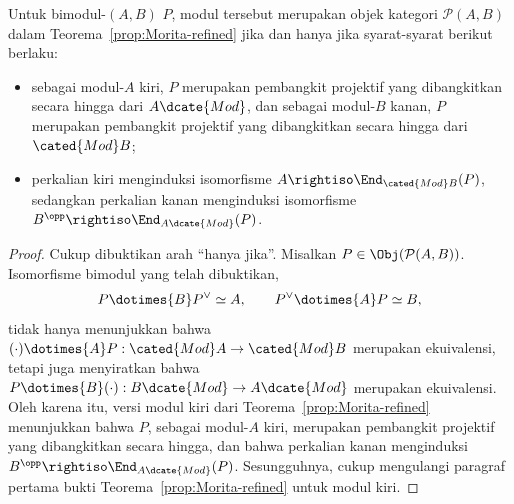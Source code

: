 \begin{corollary}\label{prop:Morita-refined-symm}
	Untuk bimodul-$(A,B)$ $P$, modul tersebut merupakan objek kategori
	$\mathcal{P}(A,B)$ dalam Teorema~\ref{prop:Morita-refined} jika dan hanya
	jika syarat-syarat berikut berlaku:
	\begin{itemize}
		\item sebagai modul-$A$ kiri, $P$ merupakan pembangkit projektif yang
		dibangkitkan secara hingga dari $A\dcate{Mod}$, dan sebagai modul-$B$
		kanan, $P$ merupakan pembangkit projektif yang dibangkitkan secara
		hingga dari $\cated{Mod}B$;
		\item perkalian kiri menginduksi isomorfisme
		$A\rightiso\End_{\cated{Mod}B}(P)$, sedangkan perkalian kanan
		menginduksi isomorfisme
		$B^{\opp}\rightiso\End_{A\dcate{Mod}}(P)$.
	\end{itemize}
\end{corollary}
\begin{proof}
	Cukup dibuktikan arah ``hanya jika''. Misalkan
	$P\in\Obj(\mathcal{P}(A,B))$. Isomorfisme bimodul yang telah
	dibuktikan,
	\[
	P\dotimes{B}P^\vee\simeq A,\qquad
	P^\vee\dotimes{A}P\simeq B,
	\]
	tidak hanya menunjukkan bahwa
	$(\cdot)\dotimes{A}P:\cated{Mod}A\to\cated{Mod}B$ merupakan ekuivalensi,
	tetapi juga menyiratkan bahwa
	$P\dotimes{B}(\cdot):B\dcate{Mod}\to A\dcate{Mod}$ merupakan
	ekuivalensi. Oleh karena itu, versi modul kiri dari
	Teorema~\ref{prop:Morita-refined} menunjukkan bahwa $P$, sebagai
	modul-$A$ kiri, merupakan pembangkit projektif yang dibangkitkan secara
	hingga, dan bahwa perkalian kanan menginduksi
	$B^{\opp}\rightiso\End_{A\dcate{Mod}}(P)$. Sesungguhnya, cukup mengulangi
	paragraf pertama bukti Teorema~\ref{prop:Morita-refined} untuk modul kiri.
\end{proof}
